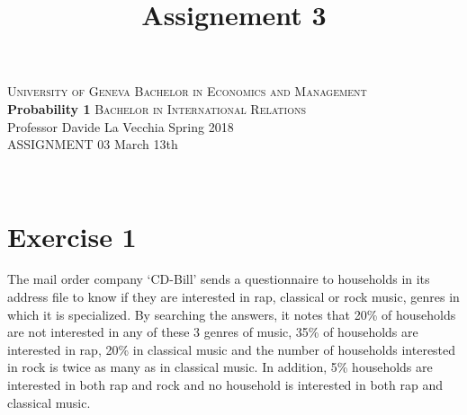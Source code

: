 \documentclass[12pt,thmsa]{article}
\title{Assignement 3}
\begin{document}
\noindent \textsc{University of Geneva}     \hfill \textsc{Bachelor in Economics and Management} \\
\textbf{Probability 1}                      \hfill \textsc{Bachelor in International Relations} \\
Professor Davide La Vecchia                 \hfill Spring 2018  \\
ASSIGNMENT 03                               \hfill   March 13th



\noindent
\makebox[\linewidth]{\rule{\textwidth}{0.4pt}}\\[1.5ex]

\section*{Exercise 1}


The mail order company `CD-Bill' sends a questionnaire to households
in its address file to know if they are interested in rap,
classical or rock  music, genres in which it is specialized. By searching the answers, it
notes that 20\% of households are not interested in any of these 3 genres of music, 35\% of households are interested in rap, 20\% in classical music and the number of households interested in rock is twice as many as in classical music. In addition, 5\%
households are interested in both rap and rock and no household is interested in
both rap and classical music.

\end{document}
